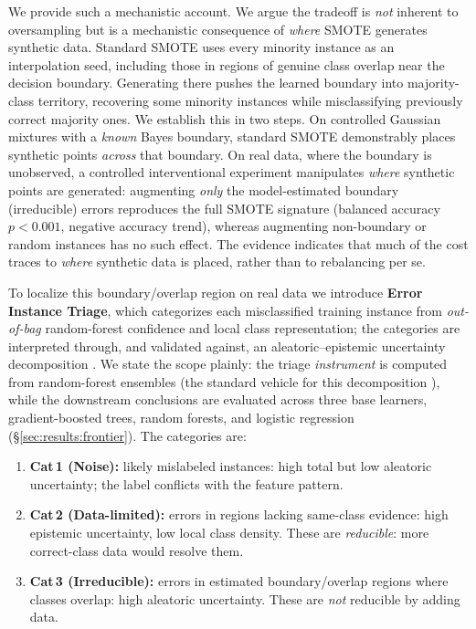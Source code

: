 We provide such a mechanistic account. We argue the tradeoff is \emph{not}
inherent to oversampling but
is a mechanistic consequence of \emph{where} SMOTE generates synthetic data.
Standard SMOTE uses every minority instance as an interpolation seed, including
those in regions of genuine class overlap near the decision boundary. Generating
there pushes the learned boundary into majority-class territory, recovering some
minority instances while misclassifying previously correct majority ones. We
establish this in two steps. On controlled Gaussian mixtures with a \emph{known}
Bayes boundary, standard SMOTE demonstrably places synthetic points \emph{across}
that boundary. On real data, where the boundary is unobserved, a controlled
interventional experiment manipulates \emph{where} synthetic points are generated:
augmenting \emph{only} the model-estimated boundary (irreducible) errors reproduces
the full SMOTE signature (balanced accuracy $p<0.001$, negative accuracy trend),
whereas augmenting non-boundary or random instances has no such effect. The
evidence indicates that much of the cost traces to \emph{where} synthetic data is
placed, rather than to rebalancing per se.

To localize this boundary/overlap region on real data we introduce \textbf{Error
Instance Triage}, which categorizes each misclassified training instance from
\emph{out-of-bag} random-forest confidence and local class representation; the
categories are interpreted through, and validated against, an
aleatoric--epistemic uncertainty decomposition
\cite{shaker2020aleatoric,hullermeier2021aleatoric}.
We state the scope plainly: the triage \emph{instrument} is computed from
random-forest ensembles (the standard vehicle for this decomposition
\cite{shaker2020aleatoric}), while the downstream conclusions are evaluated
across three base learners, gradient-boosted trees, random forests, and
logistic regression (\S\ref{sec:results:frontier}). The categories are:

\begin{enumerate}
\item \textbf{Cat\,1 (Noise):} likely mislabeled instances: high total but
  low aleatoric uncertainty; the label conflicts with the feature pattern.
\item \textbf{Cat\,2 (Data-limited):} errors in regions lacking same-class
  evidence: high epistemic uncertainty, low local class density. These are
  \emph{reducible}: more correct-class data would resolve them.
\item \textbf{Cat\,3 (Irreducible):} errors in estimated boundary/overlap regions
  where classes overlap: high aleatoric uncertainty. These are \emph{not}
  reducible by adding data.
\end{enumerate}

